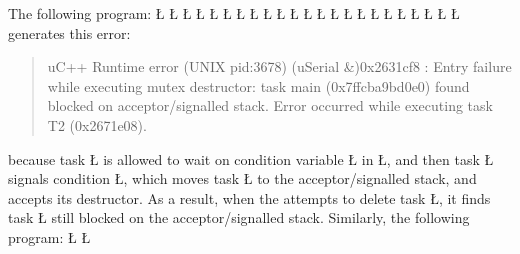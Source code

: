 \documentclass[openright,twoside]{report}
\begin{document}
The following program:
\LGinlinefalse\LGbegin\lgrinde
\L{}
\L{\LB{}}
\L{}
\L{\LB{}}
\L{}
\L{\LB{}}
\L{\LB{}}
\CE{}\L{\LB{}}
\CE{}\L{\LB{}}
\CE{}\L{\LB{}}
\L{\LB{\};}}
\endlgrinde\LGend
\LGinlinefalse\LGbegin\lgrinde
\L{}
\L{\LB{}}
\L{\LB{}}
\L{}
\L{\LB{}}
\L{\LB{\};}}
\endlgrinde\LGend
\LGinlinefalse\LGbegin\lgrinde
\L{}
\L{\LB{}}
\L{\LB{}}
\L{\LB{}}
\CE{}\L{\LB{}}
\L{\LB{\}}}
\endlgrinde\LGend
generates this error:
\begin{quote}
\BGfont
uC++ Runtime error (UNIX pid:3678) (uSerial \&)0x2631cf8 : Entry failure while executing mutex destructor: task main (0x7ffcba9bd0e0) found blocked on acceptor/signalled stack.
Error occurred while executing task T2 (0x2671e08).
\end{quote}
because task \LGinlinetrue\LGbegin\lgrinde\L{}\endlgrinde\LGend{} is allowed to wait on condition variable \LGinlinetrue\LGbegin\lgrinde\L{}\endlgrinde\LGend{} in \LGinlinetrue\LGbegin\lgrinde\L{}\endlgrinde\LGend{}, and then task \LGinlinetrue\LGbegin\lgrinde\L{}\endlgrinde\LGend{} signals condition \LGinlinetrue\LGbegin\lgrinde\L{}\endlgrinde\LGend{}, which moves task \LGinlinetrue\LGbegin\lgrinde\L{}\endlgrinde\LGend{} to the acceptor/signalled stack, and accepts its destructor.
As a result, when the  attempts to delete task \LGinlinetrue\LGbegin\lgrinde\L{}\endlgrinde\LGend{}, it finds task \LGinlinetrue\LGbegin\lgrinde\L{}\endlgrinde\LGend{} still blocked on the acceptor/signalled stack.
Similarly, the following program:
\LGinlinefalse\LGbegin\lgrinde
\L{}
\L{}
\end{document}
